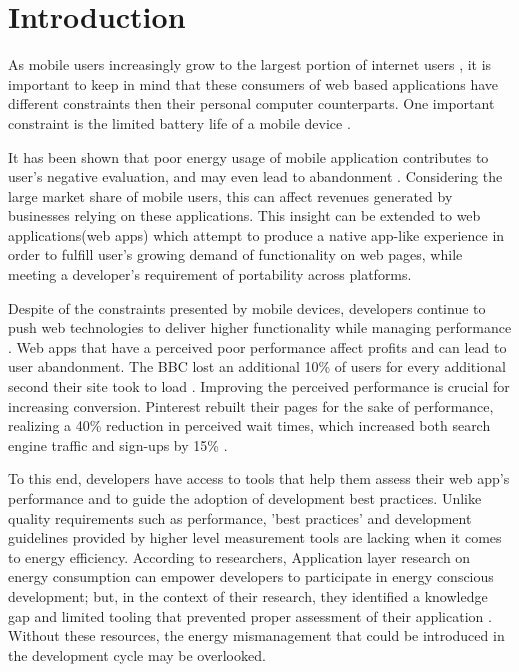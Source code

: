 \section{Introduction}

As mobile users increasingly grow to the largest portion of internet users \cite{Rep:Marketshare}, it is important to keep in mind that these consumers of web based applications have different constraints then their personal computer counterparts. One important constraint is the limited battery life of a mobile device \cite{Rep:Batt}.

It has been shown that poor energy usage of mobile application contributes to user's negative evaluation, and may even lead to abandonment \cite{WEBSITE:2}. Considering the large market share of mobile users, this can affect revenues generated by businesses relying on these applications. This insight can be extended to web applications(web apps) which attempt to produce a native app-like experience in order to fulfill user's growing demand of functionality on web pages, while meeting a developer's requirement of portability across platforms.

Despite of the constraints presented by mobile devices, developers continue to push web technologies to deliver higher functionality while managing performance \cite{Rep:State}. Web apps that have a perceived poor performance affect profits and can lead to user abandonment. The BBC lost an additional 10\% of users for every additional second their site took to load \cite{Web:bbc}. Improving the perceived performance is crucial for increasing conversion. Pinterest rebuilt their pages for the sake of performance, realizing a 40\% reduction in perceived wait times, which increased both search engine traffic and sign-ups by 15\% \cite{Web:pinterest}.

To this end, developers have access to tools that help them assess their web app's performance and to guide the adoption of development best practices. Unlike quality requirements such as performance, 'best practices' and development guidelines provided by higher level measurement tools are lacking when it comes to energy efficiency. According to researchers, Application layer research on energy consumption can empower developers to participate in energy conscious development; but, in the context of their research, they identified a knowledge gap and limited tooling that prevented proper assessment of their application \cite{Rep:EnEf}. Without these resources, the energy mismanagement that could be introduced in the development cycle may be overlooked.

